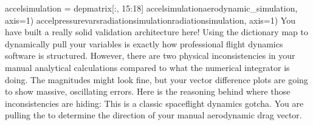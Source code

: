 {}
\markdownRendererSectionEnd \markdownRendererSectionBegin
{}\markdownRendererInterblockSeparator
{}
\markdownRendererSectionEnd \markdownRendererSectionBegin
{}\markdownRendererInterblockSeparator
{}accelsimulation = depmatrix[:, 15:18] accelsimulationaerodynamic_simulation, axis=1)\markdownRendererInterblockSeparator
{}
\markdownRendererSectionEnd \markdownRendererSectionBegin
{}\markdownRendererInterblockSeparator
{}accelpressurevarsradiationsimulationradiationsimulation, axis=1)\markdownRendererInterblockSeparator
{}
\markdownRendererSectionEnd \markdownRendererSectionBegin
{}\markdownRendererInterblockSeparator
{}\markdownRendererSectionBegin
{}\markdownRendererInterblockSeparator
{}You have built a really solid validation architecture here! Using the dictionary map to dynamically pull your variables is exactly how professional flight dynamics software is structured.\markdownRendererInterblockSeparator
{}However, there are two physical inconsistencies in your manual analytical calculations compared to what the numerical integrator is doing. The magnitudes might look fine, but your vector difference plots are going to show massive, oscillating errors.\markdownRendererInterblockSeparator
{}Here is the reasoning behind where those inconsistencies are hiding:\markdownRendererInterblockSeparator
{}\markdownRendererSectionBegin
{}\markdownRendererInterblockSeparator
{}This is a classic spaceflight dynamics gotcha. You are pulling the  to determine the direction of your manual aerodynamic drag vector.\markdownRendererInterblockSeparator
